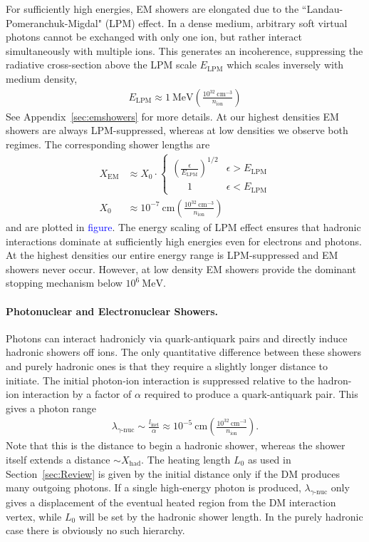 \documentclass[twocolumn, preprintnumbers,amsmath,amssymb,prd, superscriptaddress]{revtex4}
\newcommand{\MeV}{\text{MeV}}
\def\r{\right)}
\def\l{\left(}
\begin{document}
For sufficiently high energies, EM showers are elongated due to the ``Landau-Pomeranchuk-Migdal" (LPM) effect.
In a dense medium, arbitrary soft virtual photons cannot be exchanged with only one ion, but rather interact simultaneously with multiple ions.
This generates an incoherence, suppressing the radiative cross-section above the LPM scale $E_\text{LPM}$ which scales inversely with medium density,
\begin{align}
    E_\text{LPM} \approx 1~\MeV 
    \l \frac{10^{32}~\text{cm}^{-3}}{n_\text{ion}} \r
\end{align}
See Appendix~\ref{sec:emshowers} for more details.
At our highest densities EM showers are always LPM-suppressed, whereas at low densities we observe both regimes.  
The corresponding shower lengths are
\begin{align}
  X_\text{EM} &\approx X_0 \cdot \begin{cases}
  \l \frac{\epsilon}{E_\text{LPM}} \r^{1/2} & \epsilon > E_\text{LPM} \\
  \;\;\;\;\;\, 1 & \epsilon < E_\text{LPM} 
  \end{cases} \\
  X_0 &\approx 10^{-7} ~\text{cm} 
  \l\frac{10^{32}~\text{cm}^{-3}}{n_\text{ion}}\r
\end{align}
and are plotted in \textcolor{blue}{figure}.
The energy scaling of LPM effect ensures that hadronic interactions dominate at sufficiently high energies even for electrons and photons.
At the highest densities our entire energy range is LPM-suppressed and EM showers never occur. 
However, at low density EM showers provide the dominant stopping mechanism below $10^6~\MeV$.   

\paragraph{Photonuclear and Electronuclear Showers.}
Photons can interact hadronicly via quark-antiquark pairs and directly induce hadronic showers off ions.
The only quantitative difference between these showers and purely hadronic ones is that they require a slightly longer distance to initiate.
The initial photon-ion interaction is suppressed relative to the hadron-ion interaction by a factor of $\alpha$ required to produce a quark-antiquark pair.
This gives a photon range
\begin{align}
\label{eq:photonuclength}
  \lambda_{\gamma\text{-nuc}} \sim \frac{l_\text{inel}}{\alpha}
  \approx 10^{-5} ~\text{cm} \l\frac{10^{32}~\text{cm}^{-3}}{n_\text{ion}}\r.
\end{align}
Note that this is the distance to begin a hadronic shower, whereas the shower itself extends a distance $\sim X_\text{had}$.
The heating length $L_0$ as used in Section~\ref{sec:Review} is given by the initial distance only if the DM produces many outgoing photons.
If a single high-energy photon is produced, $\lambda_{\gamma\text{-nuc}}$ only gives a displacement of the eventual heated region from the DM interaction vertex, while $L_0$ will be set by the hadronic shower length.
In the purely hadronic case there is obviously no such hierarchy.
\end{document}
